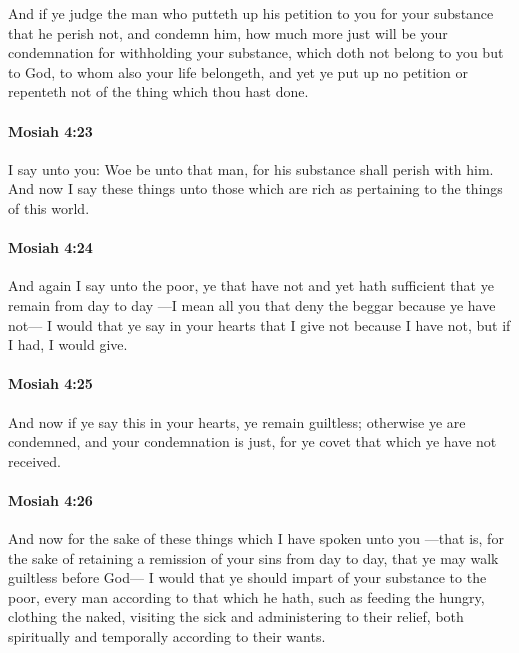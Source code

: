 			And if ye judge the man who putteth up his petition to you
			for your substance that he perish not,
			and condemn him,
			how much more just will be your condemnation
			for withholding your substance, which doth not belong to you but to God,
			to whom also your life belongeth,
			and yet ye put up no petition or repenteth not of the thing which thou hast done.

		\paragraph{Mosiah 4:23} %
			\label{MOSIAH-4-23}

			I say unto you:
			Woe be unto that man,
			for his substance shall perish with him.
			And now I say these things unto those which are rich
			as pertaining to the things of this world.

		\paragraph{Mosiah 4:24} %
			\label{MOSIAH-4-24}

			And again I say unto the poor, ye that have not
			and yet hath sufficient that ye remain from day to day
			---I mean all you that deny the beggar because ye have not---
			I would that ye say in your hearts
			that I give not because I have not,
			but if I had, I would give.

		\paragraph{Mosiah 4:25} %
			\label{MOSIAH-4-25}

			And now if ye say this in your hearts,
			ye remain guiltless;
			otherwise ye are condemned,
			and your condemnation is just,
			for ye covet that which ye have not received.

		\paragraph{Mosiah 4:26} %
			\label{MOSIAH-4-26}

			And now for the sake of these things which I have spoken unto you
			---that is, for the sake of retaining a remission of your sins from day to day,
			that ye may walk guiltless before God---
			I would that ye should impart of your substance to the poor,
			every man according to that which he hath,
			such as feeding the hungry,
			clothing the naked,
			visiting the sick and administering to their relief,
			both spiritually and temporally according to their wants.

